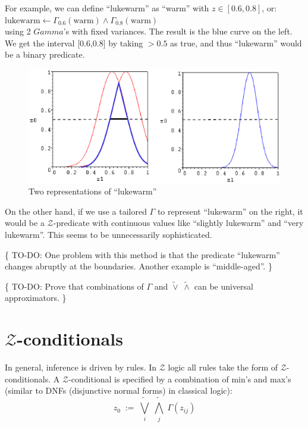 For example, we can define ``lukewarm'' as ``warm'' with $z \in [0.6,0.8]$, or:\\
\hspace*{1cm} $\mbox{lukewarm} \leftarrow \Gamma_{0.6}(\mbox{warm}) \wedge \Gamma_{0.8}(\mbox{warm})$\\
using 2 $Gamma$'s with fixed variances.  The result is the blue curve on the left.  We get the interval [0.6,0.8] by taking $> 0.5$ as true, and thus ``lukewarm'' would be a binary predicate.
\begin{figure}[H]
\centering
\includegraphics[scale=0.9]{Gamma-for-lukewarm.eps}
\caption{Two representations of ``lukewarm''}
\end{figure}
On the other hand, if we use a tailored $\Gamma$ to represent ``lukewarm'' on the right, it would be a $\mathcal{Z}$-predicate with continuous values like ``slightly lukewarm'' and ``very lukewarm''.  This seems to be unnecessarily sophisticated.

\{ TO-DO:  One problem with this method is that the predicate ``lukewarm'' changes abruptly at the boundaries.  Another example is ``middle-aged''.  \}

\{ TO-DO:  Prove that combinations of $\Gamma$ and $\widetilde{\vee} \; \widetilde{\wedge}$ can be universal approximators. \}

\section{$\mathcal{Z}$-conditionals}
\label{sec:Z-conditionals}

In general, inference is driven by rules.  In $\mathcal{Z}$ logic all rules take the form of $\mathcal{Z}$-conditionals.  A $\mathcal{Z}$-conditional is specified by a combination of min's and max's (similar to DNFs (disjunctive normal forms) in classical logic):
\begin{equation}
z_0 \; := \; \widetilde{\bigvee_i} \; \widetilde{\bigwedge_j} \; \Gamma(z_{ij})
\end{equation}

